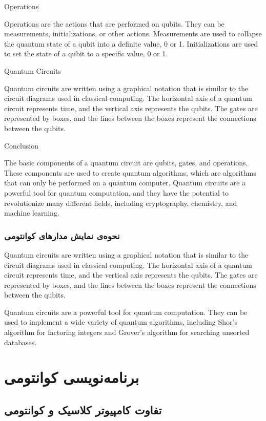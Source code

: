 \documentclass{book}
\begin{document}
Operations

Operations are the actions that are performed on qubits. They can be measurements, initializations, or other actions. Measurements are used to collapse the quantum state of a qubit into a definite value, 0 or 1. Initializations are used to set the state of a qubit to a specific value, 0 or 1.

Quantum Circuits

Quantum circuits are written using a graphical notation that is similar to the circuit diagrams used in classical computing. The horizontal axis of a quantum circuit represents time, and the vertical axis represents the qubits. The gates are represented by boxes, and the lines between the boxes represent the connections between the qubits.

Conclusion

The basic components of a quantum circuit are qubits, gates, and operations. These components are used to create quantum algorithms, which are algorithms that can only be performed on a quantum computer. Quantum circuits are a powerful tool for quantum computation, and they have the potential to revolutionize many different fields, including cryptography, chemistry, and machine learning.


\subsection{نحوه‌ی نمایش مدار‌های کوانتومی}

Quantum circuits are written using a graphical notation that is similar to the circuit diagrams used in classical computing. The horizontal axis of a quantum circuit represents time, and the vertical axis represents the qubits. The gates are represented by boxes, and the lines between the boxes represent the connections between the qubits.

Quantum circuits are a powerful tool for quantum computation. They can be used to implement a wide variety of quantum algorithms, including Shor's algorithm for factoring integers and Grover's algorithm for searching unsorted databases.

\chapter{برنامه‌نویسی کوانتومی}
\section{تفاوت کامپیوتر کلاسیک و کوانتومی}
\end{document}
